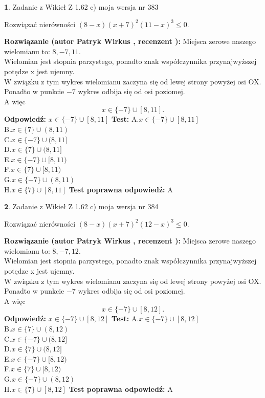 \documentclass[12pt, a4paper]{article}
\theoremstyle{definition} %
\newtheorem{zad}{}
\newcommand{\zadStart}[1]{\begin{zad}#1\newline}
\newcommand{\zadStop}{\end{zad}}
\newcommand{\rozwStart}[2]{\noindent \textbf{Rozwiązanie (autor #1 , recenzent #2): }\newline}
\newcommand{\rozwStop}{\newline}
\newcommand{\odpStart}{\noindent \textbf{Odpowiedź:}\newline}
\newcommand{\odpStop}{\newline}
\newcommand{\testStart}{\noindent \textbf{Test:}\newline}
\newcommand{\testStop}{\newline}
\newcommand{\kluczStart}{\noindent \textbf{Test poprawna odpowiedź:}\newline}
\newcommand{\kluczStop}{\newline}
\begin{document}
\zadStart{Zadanie z Wikieł Z 1.62 c) moja wersja nr 383}

Rozwiązać nierówności $(8-x)(x+7)^{2}(11-x)^{3}\le0$.
\zadStop
\rozwStart{Patryk Wirkus}{}
Miejsca zerowe naszego wielomianu to: $8, -7, 11$.\\
Wielomian jest stopnia parzystego, ponadto znak współczynnika przy\linebreak najwyższej potędze x jest ujemny.\\ W związku z tym wykres wielomianu zaczyna się od lewej strony powyżej osi OX.\\
Ponadto w punkcie $-7$ wykres odbija się od osi poziomej.\\
A więc $$x \in \{-7\} \cup [8,11].$$
\rozwStop
\odpStart
$x \in \{-7\} \cup [8,11]$
\odpStop
\testStart
A.$x \in \{-7\} \cup [8,11]$\\
B.$x \in \{7\} \cup (8,11)$\\
C.$x \in \{-7\} \cup (8,11]$\\
D.$x \in \{7\} \cup (8,11]$\\
E.$x \in \{-7\} \cup [8,11)$\\
F.$x \in \{7\} \cup [8,11)$\\
G.$x \in \{-7\} \cup (8,11)$\\
H.$x \in \{7\} \cup [8,11]$
\testStop
\kluczStart
A
\kluczStop



\zadStart{Zadanie z Wikieł Z 1.62 c) moja wersja nr 384}

Rozwiązać nierówności $(8-x)(x+7)^{2}(12-x)^{3}\le0$.
\zadStop
\rozwStart{Patryk Wirkus}{}
Miejsca zerowe naszego wielomianu to: $8, -7, 12$.\\
Wielomian jest stopnia parzystego, ponadto znak współczynnika przy\linebreak najwyższej potędze x jest ujemny.\\ W związku z tym wykres wielomianu zaczyna się od lewej strony powyżej osi OX.\\
Ponadto w punkcie $-7$ wykres odbija się od osi poziomej.\\
A więc $$x \in \{-7\} \cup [8,12].$$
\rozwStop
\odpStart
$x \in \{-7\} \cup [8,12]$
\odpStop
\testStart
A.$x \in \{-7\} \cup [8,12]$\\
B.$x \in \{7\} \cup (8,12)$\\
C.$x \in \{-7\} \cup (8,12]$\\
D.$x \in \{7\} \cup (8,12]$\\
E.$x \in \{-7\} \cup [8,12)$\\
F.$x \in \{7\} \cup [8,12)$\\
G.$x \in \{-7\} \cup (8,12)$\\
H.$x \in \{7\} \cup [8,12]$
\testStop
\kluczStart
A
\kluczStop
\end{document}
